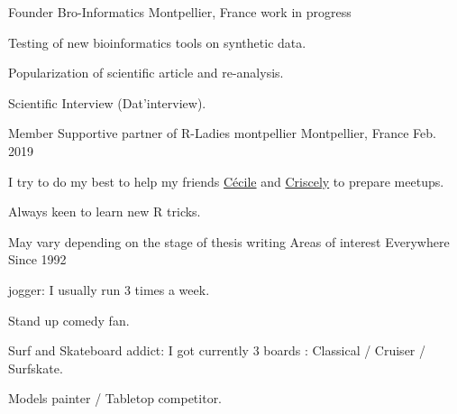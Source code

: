 

\begin{cventries}

  \cventry
    {Founder} %
    {Bro-Informatics} %
    {Montpellier, France} %
    {work in progress} %
    {
      \begin{cvitems} %
        \item {Testing of new bioinformatics tools on synthetic data.}
        \item {Popularization of scientific article and re-analysis.}
        \item {Scientific Interview (Dat'interview).}
      \end{cvitems}
    }

  \cventry
    {Member} %
    {Supportive partner of R-Ladies montpellier} %
    {Montpellier, France} %
    {Feb. 2019} %
    {
      \begin{cvitems} %
        \item {I try to do my best to help my friends \href{https://github.com/cecilesauder}{Cécile} and \href{https://github.com/CriscelyLP}{Criscely} to prepare meetups.}
        \item {Always keen to learn new R tricks.}
      \end{cvitems}
    }
    
  \cventry
    {May vary depending on the stage of thesis writing} %
    {Areas of interest} %
    {Everywhere} %
    {Since 1992} %
    {
      \begin{cvitems} %
        \item {jogger: I usually run 3 times a week.}
        \item {Stand up comedy fan.}
        \item {Surf and Skateboard addict: I got currently 3 boards : Classical / Cruiser / Surfskate.}
        \item {Models painter / Tabletop competitor.}
      \end{cvitems}
    }

\end{cventries}
